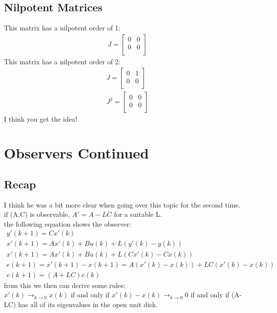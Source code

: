 \documentclass[a4paper,11pt]{article}
\begin{document}
			\subsection{Nilpotent Matrices}
			This matrix has a nilpotent order of 1:\\
			\begin{gather}
				J=
				\begin{bmatrix}
					0 & 0 \\
					0 & 0 \\
				\end{bmatrix}
			\end{gather}
			This matrix has a nilpotent order of 2:\\
			\begin{gather}
				J=
				\begin{bmatrix}
					0 & 1 \\
					0 & 0 \\
				\end{bmatrix}\\
								J^2=
				\begin{bmatrix}
					0 & 0 \\
					0 & 0 \\
				\end{bmatrix}
			\end{gather}
			I think you get the idea!
\section{Observers Continued}
	\subsection{Recap}
	I think he was a bit more clear when going over this topic for the second time.\\
	if (A,C) is observable, $A'=A-LC$ for a suitable L.\\
	the following equation shows the observer:
	\begin{gather}
		y'(k+1)=Cx'(k)\\
		x'(k+1) =Ax'(k) + Bu(k) + L(y'(k)-y(k))\\
		x'(k+1) =Ax'(k) + Bu(k) + L(Cx'(k)-Cx(k))\\
		e(k+1) = x'(k+1) - x(k+1) = A(x'(k)-x(k))+LC(x'(k)-x(k))\\
		e(k+1) = (A+LC)e(k)
	\end{gather}	
	from this we then can derive some rules:\\
	$x'(k)\rightarrow_{k\rightarrow 0}x(k)$ if and only if $x'(k)-x(k)\rightarrow_{k\rightarrow 0}0$ if and only if (A-LC) has all of its eigenvalues in the open unit disk.\\
\end{document}
